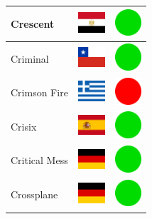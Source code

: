 \documentclass[12pt, a4paper, twoside]{report}
\begin{document}
\begin{center}
\begin{longtable}{|p{5cm}|p{2cm}|p{2cm}|}
 Crescent                                                   & \includegraphics[width=1cm]{../4x3/eg} &   \includegraphics[width=1cm]{../likes/y} \\ \hline
 Criminal                                                   & \includegraphics[width=1cm]{../4x3/cl} &   \includegraphics[width=1cm]{../likes/y} \\ \hline
 Crimson Fire                                               & \includegraphics[width=1cm]{../4x3/gr} &   \includegraphics[width=1cm]{../likes/n} \\ \hline
 Crisix                                                     & \includegraphics[width=1cm]{../4x3/es} &   \includegraphics[width=1cm]{../likes/y} \\ \hline
 Critical Mess                                              & \includegraphics[width=1cm]{../4x3/de} &   \includegraphics[width=1cm]{../likes/y} \\ \hline
 Crossplane                                                 & \includegraphics[width=1cm]{../4x3/de} &   \includegraphics[width=1cm]{../likes/y} \\ \hline

\end{longtable}
\end{center}
\end{document}
